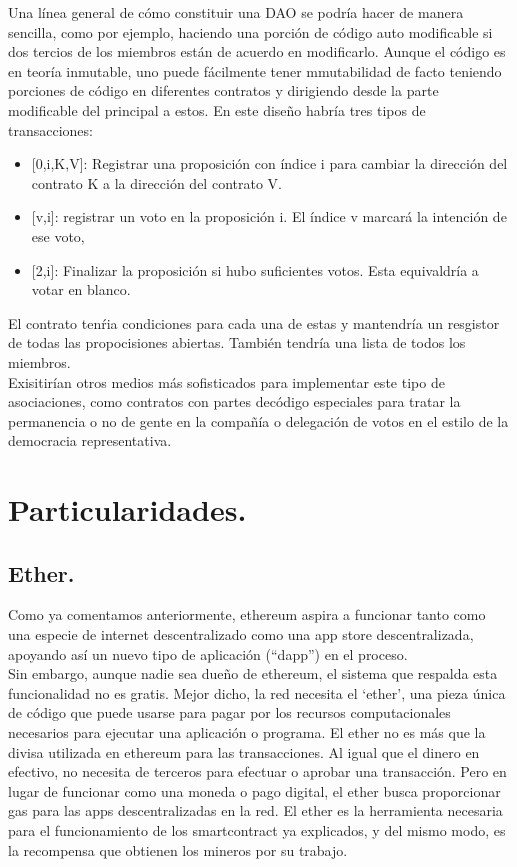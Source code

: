 \documentclass[11pt,a4paper]{article}
\begin{document}
Una línea general de cómo constituir una DAO se podría hacer de manera sencilla, como por ejemplo, haciendo una porción de código auto modificable si dos tercios de los miembros están de acuerdo en modificarlo. Aunque el código es en teoría inmutable, uno puede fácilmente tener mmutabilidad de facto teniendo porciones de código en diferentes contratos y dirigiendo desde la parte modificable del principal a estos. En este diseño habría tres tipos de transacciones:
\begin{itemize}
	\item {[0,i,K,V]}: Registrar una proposición con índice i para cambiar la dirección del contrato K a la dirección del contrato V.
	\item  {[v,i]}:  registrar un voto en la proposición i. El índice v marcará la intención de ese voto,   
	\item  {[2,i]}: Finalizar la proposición si hubo suficientes votos. Esta equivaldría a votar en blanco.
\end{itemize}

El contrato tenŕia condiciones para cada una de estas y mantendría un resgistor de todas las propocisiones abiertas.  También tendría una lista de todos los miembros.\\

Exisitirían otros medios más sofisticados para implementar este tipo de asociaciones, como contratos con partes decódigo especiales para tratar la permanencia o no de gente en la compañía o delegación de votos en el estilo de la democracia representativa.

\section{Particularidades.}

\subsection{Ether.}
\label{sec:ether}

Como ya comentamos anteriormente, ethereum aspira a funcionar tanto como una especie de
internet descentralizado como una app store descentralizada, apoyando así un nuevo tipo de aplicación (“dapp”) en el proceso.\\

Sin embargo, aunque nadie sea dueño de ethereum, el sistema que respalda esta funcionalidad no es gratis. Mejor dicho, la red necesita el ‘ether’, una pieza única de código que puede usarse para pagar por los recursos computacionales necesarios para ejecutar una aplicación o programa. El ether no es más que la divisa utilizada en ethereum para las transacciones. Al igual que el dinero en efectivo, no necesita de terceros para efectuar o aprobar una transacción. Pero en lugar de funcionar como una moneda o pago digital, el ether busca proporcionar gas para las apps descentralizadas en la red. El ether es la herramienta necesaria para el funcionamiento de los smartcontract ya explicados,  y del mismo modo, es la recompensa que obtienen los mineros por su trabajo.\\
\end{document}
